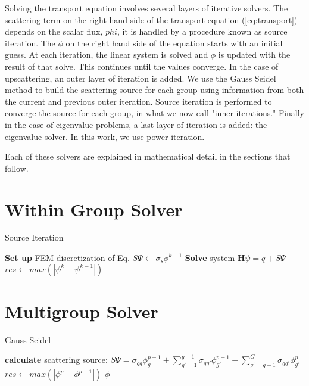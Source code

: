 
Solving the transport equation involves several layers of iterative solvers. The scattering term on the right hand side of the transport equation (\ref{eq:transport}) depends on the scalar flux, $phi$, it is handled by a procedure known as source iteration. The $\phi$ on the right hand side of the equation starts with an initial guess. At each iteration, the linear system is solved and $\phi$ is updated with the result of that solve. This continues until the values converge. In the case of upscattering, an outer layer of iteration is added. We use the Gauss Seidel method to build the scattering source for each group using information from both the current and previous outer iteration. Source iteration is performed to converge the source for each group, in what we now call "inner iterations." Finally in the case of eigenvalue problems, a last layer of iteration is added: the eigenvalue solver. In this work, we use power iteration.
\par
Each of these solvers are explained in mathematical detail in the sections that follow.
\section{Within Group Solver}
\begin{algorithm}
\caption{Source Iteration}
\begin{algorithmic}
 
    \State \textbf{Set up} FEM discretization of Eq.
    \State $S\Psi \gets \sigma_s \phi^{k-1}$ 
    \State \textbf{Solve} system $\textbf{H}\psi=q + S\Psi$
    \State $res \gets max(|\psi^{k} - \psi^{k-1}|)$
\EndWhile
\end{algorithmic}
\end{algorithm}

\section{Multigroup Solver}
\begin{algorithm}
\caption{Gauss Seidel}
\begin{algorithmic}
     
            \State \textbf{calculate} scattering source: \State $S\Psi = \sigma_{gg}\phi_g^{p+1} + \sum\limits_{g'=1}^{g-1} \sigma_{gg'} \phi_{g'}^{p+1} + \sum\limits_{g'=g+1}^G \sigma_{gg'}\phi_{g'}^p$
        \EndProcedure
        \EndFor
        \State $res \gets max(|\phi^{p} - \phi^{p-1}|)$  
        \EndWhile
    \Return $\phi$
\end{algorithmic}
\end{algorithm}

